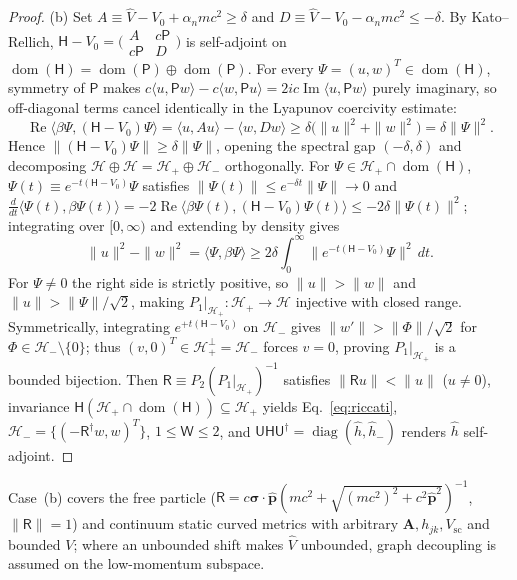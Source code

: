 \documentclass[aps,prd,onecolumn,tightenlines,nofootinbib,notitlepage,10pt,floatfix]{revtex4-2}
\theoremstyle{indentedtheorem}
\begin{document}
\begin{proof}
(b) Set $A\equiv\hat{V}-V_0+\alpha_n m c^2\ge\delta$ and $D\equiv\hat{V}-V_0-\alpha_n m c^2\le -\delta$. By Kato--Rellich, $\mathsf{H}-V_0=\bigl(\begin{smallmatrix}A&c\mathsf{P}\\c\mathsf{P}&D\end{smallmatrix}\bigr)$ is self-adjoint on $\operatorname{dom}(\mathsf{H})=\operatorname{dom}(\mathsf{P})\oplus\operatorname{dom}(\mathsf{P})$. For every $\Psi=(u,w)^T\in\operatorname{dom}(\mathsf{H})$, symmetry of $\mathsf{P}$ makes $c\langle u,\mathsf{P}w\rangle-c\langle w,\mathsf{P}u\rangle=2ic\operatorname{Im}\langle u,\mathsf{P}w\rangle$ purely imaginary, so off-diagonal terms cancel identically in the Lyapunov coercivity estimate:
\begin{equation}
    \operatorname{Re}\langle\beta\Psi,(\mathsf{H}-V_0)\Psi\rangle = \langle u,Au\rangle - \langle w,Dw\rangle \ge \delta\big(\|u\|^2+\|w\|^2\big) = \delta\|\Psi\|^2 .
    \label{eq:lyapunov_coercive}
\end{equation}
Hence $\|(\mathsf{H}-V_0)\Psi\|\ge\delta\|\Psi\|$, opening the spectral gap $(-\delta,\delta)$ and decomposing $\mathcal{H}\oplus\mathcal{H}=\mathcal{H}_+\oplus\mathcal{H}_-$ orthogonally. For $\Psi\in\mathcal{H}_+\cap\operatorname{dom}(\mathsf{H})$, $\Psi(t)\equiv e^{-t(\mathsf{H}-V_0)}\Psi$ satisfies $\|\Psi(t)\|\le e^{-\delta t}\|\Psi\|\to 0$ and $\frac{d}{dt}\langle\Psi(t),\beta\Psi(t)\rangle=-2\operatorname{Re}\langle\beta\Psi(t),(\mathsf{H}-V_0)\Psi(t)\rangle\le -2\delta\|\Psi(t)\|^2$; integrating over $[0,\infty)$ and extending by density gives
\begin{equation}
    \|u\|^2 - \|w\|^2 = \langle\Psi,\beta\Psi\rangle \ge 2\delta\int_0^\infty \big\|e^{-t(\mathsf{H}-V_0)}\Psi\big\|^2\,dt .
    \label{eq:lyapunov_gap}
\end{equation}
For $\Psi\neq 0$ the right side is strictly positive, so $\|u\|>\|w\|$ and $\|u\|>\|\Psi\|/\sqrt{2}$, making $P_1|_{\mathcal{H}_+}:\mathcal{H}_+\to\mathcal{H}$ injective with closed range. Symmetrically, integrating $e^{+t(\mathsf{H}-V_0)}$ on $\mathcal{H}_-$ gives $\|w'\|>\|\Phi\|/\sqrt{2}$ for $\Phi\in\mathcal{H}_-\setminus\{0\}$; thus $(v,0)^T\in\mathcal{H}_+^\perp=\mathcal{H}_-$ forces $v=0$, proving $P_1|_{\mathcal{H}_+}$ is a bounded bijection. Then $\mathsf{R}\equiv P_2(P_1|_{\mathcal{H}_+})^{-1}$ satisfies $\|\mathsf{R}u\|<\|u\|$ ($u\neq 0$), invariance $\mathsf{H}(\mathcal{H}_+\cap\operatorname{dom}(\mathsf{H}))\subseteq\mathcal{H}_+$ yields Eq.~\eqref{eq:riccati}, $\mathcal{H}_-=\{(-\mathsf{R}^\dagger w,w)^T\}$, $1\le\mathsf{W}\le 2$, and $\mathsf{U}\mathsf{H}\mathsf{U}^\dagger=\operatorname{diag}(\hat{h},\hat{h}_-)$ renders $\hat{h}$ self-adjoint.
\end{proof}
\noindent Case~(b) covers the free particle ($\mathsf{R}=c\boldsymbol{\sigma}\cdot\hat{\mathbf{p}}(mc^2+\sqrt{(mc^2)^2+c^2\hat{\mathbf{p}}^2})^{-1}$, $\|\mathsf{R}\|=1$) and continuum static curved metrics with arbitrary $\mathbf{A},h_{jk},V_\text{sc}$ and bounded $V$; where an unbounded shift makes $\hat{V}$ unbounded, graph decoupling is assumed on the low-momentum subspace.
\end{document}
